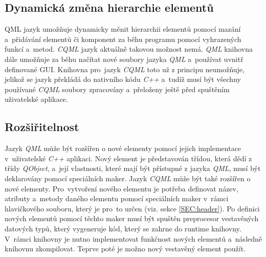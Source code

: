 \documentclass[11pt,twoside,a4paper]{book}
\begin{document}
\subsection{Dynamická změna hierarchie elementů}
QML jazyk umožňuje dynamicky měnit hierarchii elementů pomocí mazání a~přidávání elementů či komponent za běhu programu pomocí vyhrazených funkcí a~metod. \textit{CQML} jazyk aktuálně takovou možnost nemá. \textit{QML} knihovna dále umožňuje za běhu načítat nové soubory jazyka \textit{QML} a~používat uvnitř definované GUI. Knihovna pro~jazyk \textit{CQML} toto už z principu neumožňuje, jelikož se jazyk překládá do nativního kódu \textit{C++} a~tudíž musí být všechny používané \textit{CQML} soubory zpracovány a~přeloženy ještě před spuštěním uživatelské aplikace.
\subsection{Rozšiřitelnost}
Jazyk \textit{QML} může být rozšířen o nové elementy pomocí jejich implementace v~uživatelské \textit{C++} aplikaci. Nový element je představován třídou, která dědí z třídy \textit{QObject}, a~její vlastnosti, které mají být přístupné z jazyka \textit{QML}, musí být deklarovány pomocí speciálních maker. 
Jazyk \textit{CQML} může být také rozšířen o nové elementy. Pro~vytvoření nového elementu je potřeba definovat název, atributy a~metody daného elementu pomocí speciálních maker v~rámci hlavičkového souboru, který je pro~to určen (viz. sekce \ref{SEC:header}). Po definici nových elementů pomocí těchto maker musí být spuštěn preprocesor vestavěných datových typů, který vygeneruje kód, který se zahrne do runtime knihovny. V~rámci knihovny je nutno implementovat funkčnost nových elementů a~následně knihovnu zkompilovat. Teprve poté je možno nový vestavěný element použít.
\end{document}
